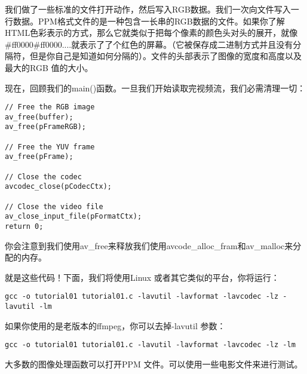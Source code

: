 我们做了一些标准的文件打开动作，然后写入RGB数据。我们一次向文件写入一行数据。PPM格式文件的是一种包含一长串的RGB数据的文件。如果你了解HTML色彩表示的方式，那么它就类似于把每个像素的颜色头对头的展开，就像\#ff0000\#ff0000....就表示了了个红色的屏幕。（它被保存成二进制方式并且没有分隔符，但是你自己是知道如何分隔的）。文件的头部表示了图像的宽度和高度以及最大的RGB 值的大小。

现在，回顾我们的main()函数。一旦我们开始读取完视频流，我们必需清理一切：
\begin{lstlisting}
// Free the RGB image
av_free(buffer);
av_free(pFrameRGB);

// Free the YUV frame
av_free(pFrame);

// Close the codec
avcodec_close(pCodecCtx);

// Close the video file
av_close_input_file(pFormatCtx);
return 0;
\end{lstlisting}

你会注意到我们使用av_free来释放我们使用avcode_alloc_fram和av_malloc来分配的内存。

就是这些代码！下面，我们将使用Linux 或者其它类似的平台，你将运行：
\begin{lstlisting}
gcc -o tutorial01 tutorial01.c -lavutil -lavformat -lavcodec -lz -lavutil -lm
\end{lstlisting}

如果你使用的是老版本的ffmpeg，你可以去掉-lavutil 参数：
\begin{lstlisting}
gcc -o tutorial01 tutorial01.c -lavutil -lavformat -lavcodec -lz -lm
\end{lstlisting}

大多数的图像处理函数可以打开PPM 文件。可以使用一些电影文件来进行测试。
